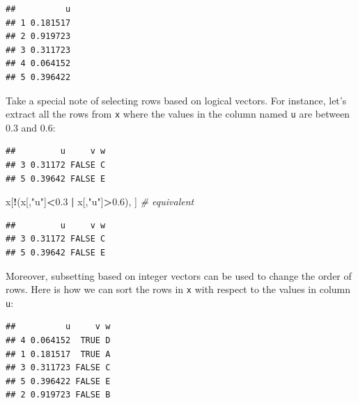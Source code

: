 \documentclass[10pt,b5paper,krantz1]{krantz}
\newenvironment{Shaded}{\begin{snugshade}}{\end{snugshade}}
\newcommand{\CommentTok}[1]{\textcolor[rgb]{0.37,0.37,0.37}{\textit{#1}}}
\newcommand{\FloatTok}[1]{\textcolor[rgb]{0.06,0.06,0.06}{#1}}
\newcommand{\KeywordTok}[1]{\textcolor[rgb]{0.27,0.27,0.27}{\textbf{#1}}}
\newcommand{\NormalTok}[1]{#1}
\newcommand{\OperatorTok}[1]{\textcolor[rgb]{0.43,0.43,0.43}{\textbf{#1}}}
\newcommand{\StringTok}[1]{\textcolor[rgb]{0.5,0.5,0.5}{#1}}
\begin{document}
\begin{verbatim}
##          u
## 1 0.181517
## 2 0.919723
## 3 0.311723
## 4 0.064152
## 5 0.396422
\end{verbatim}

Take a special note of selecting rows based on logical vectors.
For instance, let's extract all the rows from \texttt{x} where the values
in the column named \texttt{u} are between 0.3 and 0.6:

\begin{Shaded}
\end{Shaded}

\begin{verbatim}
##         u     v w
## 3 0.31172 FALSE C
## 5 0.39642 FALSE E
\end{verbatim}

\begin{Shaded}
\begin{Highlighting}[]
\NormalTok{x[}\OperatorTok{!}\NormalTok{(x[,}\StringTok{"u"}\NormalTok{]}\OperatorTok{<}\FloatTok{0.3} \OperatorTok{|}\StringTok{ }\NormalTok{x[,}\StringTok{"u"}\NormalTok{]}\OperatorTok{>}\FloatTok{0.6}\NormalTok{), ] }\CommentTok{# equivalent}
\end{Highlighting}
\end{Shaded}

\begin{verbatim}
##         u     v w
## 3 0.31172 FALSE C
## 5 0.39642 FALSE E
\end{verbatim}

Moreover, subsetting based on integer vectors can be used to
change the order of rows. Here is how we can sort the rows in \texttt{x}
with respect to the values in column \texttt{u}:

\begin{Shaded}
\end{Shaded}

\begin{verbatim}
##          u     v w
## 4 0.064152  TRUE D
## 1 0.181517  TRUE A
## 3 0.311723 FALSE C
## 5 0.396422 FALSE E
## 2 0.919723 FALSE B
\end{verbatim}
\end{document}
